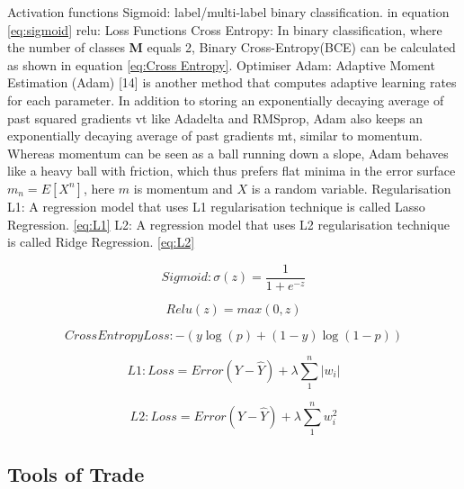 \begin{outline}
 \1 Activation functions 
   \2 Sigmoid: label/multi-label binary classification. in equation \ref{eq:sigmoid}
   \2 relu: 
 \1 Loss Functions
    \2 Cross Entropy: In binary classification, where the number of classes \textbf{M} equals 2, Binary Cross-Entropy(BCE) can be calculated as shown in equation \ref{eq:Cross Entropy}. 
 \1 Optimiser
    \2 Adam: Adaptive Moment Estimation (Adam) [14] is another method that computes adaptive learning rates for each parameter. In addition to storing an exponentially decaying average of past squared gradients vt like Adadelta and RMSprop, Adam also keeps an exponentially decaying average of past gradients mt, similar to momentum. Whereas momentum can be seen as a ball running down a slope, Adam behaves like a heavy ball with friction, which thus prefers flat minima in the error surface $m_n = E[X^n]$, here $m$ is momentum and $X$ is a random variable. 
 \1 Regularisation
    \2 L1: A regression model that uses L1 regularisation technique is called Lasso Regression. \ref{eq:L1}
    \2 L2: A regression model that uses L2 regularisation technique is called Ridge Regression. \ref{eq:L2}

\end{outline}


\begin{equation} \label{eq:sigmoid}
    Sigmoid: \sigma(z) = \frac{1} {1 + e^{-z}}
\end{equation}

\begin{equation} \label{eq:Relu}
    Relu(z) = max(0, z)
\end{equation}


\begin{equation} \label{eq:Cross Entropy}
   Cross Entropy Loss: -{(y\log(p) + (1 - y)\log(1 - p))}
\end{equation}

\begin{equation} \label{eq:L1}
    L1: Loss = Error(Y - \widehat{Y}) + \lambda \sum_1^n |w_i|
\end{equation}

\begin{equation} \label{eq:L2}
    L2: Loss = Error(Y - \widehat{Y}) +  \lambda \sum_1^n w_i^{2}
\end{equation}

\subsection{Tools of Trade}

